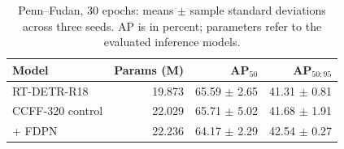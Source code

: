 \begin{table}[!htbp]
\centering
\caption{Penn--Fudan, 30 epochs: means $\pm$ sample standard deviations across three seeds. AP is in percent; parameters refer to the evaluated inference models.}
\label{tab:robustness}
\footnotesize
\setlength{\tabcolsep}{3pt}
\begin{tabular}{lrrr}
\toprule
Model & Params (M) & AP$_{50}$ & AP$_{50:95}$\\
\midrule
RT-DETR-R18 & 19.873 & 65.59 $\pm$ 2.65 & 41.31 $\pm$ 0.81\\
CCFF-320 control & 22.029 & 65.71 $\pm$ 5.02 & 41.68 $\pm$ 1.91\\
+ FDPN & 22.236 & 64.17 $\pm$ 2.29 & 42.54 $\pm$ 0.27\\
\bottomrule
\end{tabular}
\end{table}
